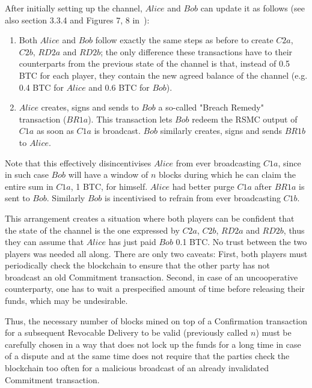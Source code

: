     After initially setting up the channel, $Alice$ and $Bob$ can update it as follows
    (see also section 3.3.4 and Figures 7, 8 in~\cite{lightning}):
    \begin{enumerate}
      \item Both $Alice$ and $Bob$ follow exactly the same steps as before to create
      $C2a$, $C2b$, $RD2a$ and $RD2b$; the only difference these transactions have to
      their counterparts from the previous state of the channel is that, instead of 0.5
      BTC for each player, they contain the new agreed balance of the channel (e.g. 0.4
      BTC for $Alice$ and 0.6 BTC for $Bob$).

      \item $Alice$ creates, signs and sends to $Bob$ a so-called "Breach Remedy"
      transaction ($BR1a$). This transaction lets $Bob$ redeem the RSMC output of $C1a$ as
      soon as $C1a$ is broadcast. $Bob$ similarly creates, signs and sends $BR1b$ to
      $Alice$.
    \end{enumerate}
    Note that this effectively disincentivises $Alice$ from ever broadcasting $C1a$, since
    in such case $Bob$ will have a window of $n$ blocks during which he can claim the
    entire sum in $C1a$, 1 BTC, for himself. $Alice$ had better purge $C1a$ after $BR1a$
    is sent to $Bob$. Similarly $Bob$ is incentivised to refrain from ever broadcasting
    $C1b$.

    This arrangement creates a situation where both players can be confident that the
    state of the channel is the one expressed by $C2a$, $C2b$, $RD2a$ and $RD2b$, thus
    they can assume that $Alice$ has just paid $Bob$ 0.1 BTC. No trust between the two
    players was needed all along. There are only two caveats: First, both players must
    periodically check the blockchain to ensure that the other party has not broadcast an
    old Commitment transaction. Second, in case of an uncooperative counterparty, one has
    to wait a prespecified amount of time before releasing their funds, which may be
    undesirable.

    Thus, the necessary number of blocks mined on top of a Confirmation transaction for a
    subsequent Revocable Delivery to be valid (previously called $n$) must be carefully
    chosen in a way that does not lock up the funds for a long time in case of a dispute
    and at the same time does not require that the parties check the blockchain too often
    for a malicious broadcast of an already invalidated Commitment transaction.

